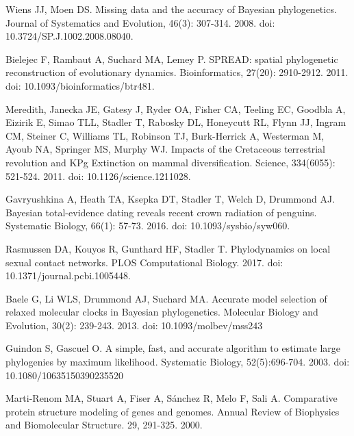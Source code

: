 \documentclass[10pt,letterpaper]{article}
\begin{document}
\begin{thebibliography}{10}
Wiens JJ, Moen DS.
\newblock Missing data and the accuracy of Bayesian phylogenetics.
\newblock Journal of Systematics and Evolution, 46(3): 307-314. 2008. doi: 10.3724/SP.J.1002.2008.08040.

Bielejec F, Rambaut A, Suchard MA, Lemey P.
\newblock SPREAD: spatial phylogenetic reconstruction of evolutionary dynamics.
\newblock Bioinformatics, 27(20): 2910-2912. 2011. doi: 10.1093/bioinformatics/btr481.

Meredith, Janecka JE, Gatesy J, Ryder OA, Fisher CA, Teeling EC, Goodbla A, Eizirik E, Simao TLL, Stadler T, Rabosky DL, Honeycutt RL, Flynn JJ, Ingram CM, Steiner C, Williams TL, Robinson TJ, Burk-Herrick A, Westerman M, Ayoub NA, Springer MS, Murphy WJ.
\newblock Impacts of the Cretaceous terrestrial revolution and KPg Extinction on mammal diversification.
\newblock Science, 334(6055): 521-524. 2011. doi: 10.1126/science.1211028.

Gavryushkina A, Heath TA, Ksepka DT, Stadler T, Welch D, Drummond AJ.
\newblock Bayesian total-evidence dating reveals recent crown radiation of penguins.
\newblock Systematic Biology, 66(1): 57-73. 2016. doi: 10.1093/sysbio/syw060.

Rasmussen DA, Kouyos R, Gunthard HF, Stadler T.
\newblock Phylodynamics on local sexual contact networks.
\newblock PLOS Computational Biology. 2017. doi: 10.1371/journal.pcbi.1005448.


Baele G, Li WLS, Drummond AJ, Suchard MA.
\newblock Accurate model selection of relaxed molecular clocks in Bayesian phylogenetics.
\newblock Molecular Biology and Evolution, 30(2): 239-243. 2013. doi: 10.1093/molbev/mss243

Guindon S, Gascuel O.
\newblock A simple, fast, and accurate algorithm to estimate large phylogenies by maximum likelihood.
\newblock Systematic Biology, 52(5):696-704. 2003. doi: 10.1080/10635150390235520

% 
Marti-Renom MA, Stuart A, Fiser A, Sánchez R, Melo F, Sali A. 
\newblock Comparative protein structure modeling of genes and genomes.
\newblock Annual Review of Biophysics and Biomolecular Structure. 29, 291-325. 2000.


\end{thebibliography}
\end{document}

